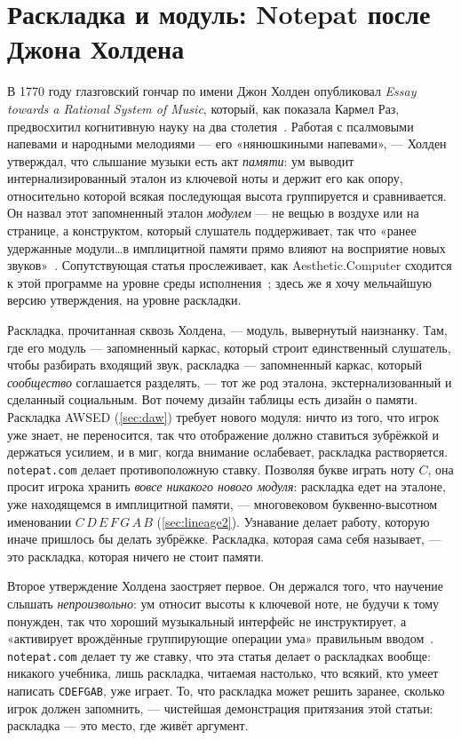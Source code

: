 \documentclass[10pt,letterpaper,twocolumn]{article}
\newcommand{\acdot}{{\color{acpink}.}}
\newcommand{\ac}{Aesthetic{\acdot}Computer}
\DeclareRobustCommand{\key}[1]{\tikz[baseline=(k.base)]{%
 \node[fill=keystroke, rounded corners=1.3pt, inner xsep=2.4pt,
    inner ysep=1.9pt, anchor=base, yshift=-1.2pt] at (0,0)
  {\footnotesize\ttfamily\bfseries\vphantom{A}\phantom{#1}};
 \node[draw=keystroke, line width=0.4pt, fill=keyfill,
    rounded corners=1.3pt, inner xsep=2.4pt, inner ysep=1.9pt,
    anchor=base] (k) at (0,0)
  {\footnotesize\ttfamily\bfseries\vphantom{A}#1};}}
\begin{document}
\appendix
\renewcommand{\thesection}{Приложение~\Alph{section}}

\section{Раскладка и модуль: Notepat после Джона Холдена}
\label{app:holden}

В 1770 году глазговский гончар по имени Джон Холден опубликовал \emph{Essay towards a Rational System of Music}, который, как показала Кармел Раз, предвосхитил когнитивную науку на два столетия~\citep{holden1770,raz2025}. Работая с псалмовыми напевами и народными мелодиями --- его «нянюшкиными напевами», --- Холден утверждал, что слышание музыки есть акт \emph{памяти}: ум выводит интернализированный эталон из ключевой ноты и держит его как опору, относительно которой всякая последующая высота группируется и сравнивается. Он назвал этот запомненный эталон \emph{модулем} --- не вещью в воздухе или на странице, а конструктом, который слушатель поддерживает, так что «ранее удержанные модули\ldots в имплицитной памяти прямо влияют на восприятие новых звуков»~\citep{raz2025}. Сопутствующая статья прослеживает, как \ac{} сходится к этой программе на уровне среды исполнения~\citep{scudder2026holden}; здесь же я хочу мельчайшую версию утверждения, на уровне раскладки.

Раскладка, прочитанная сквозь Холдена, --- модуль, вывернутый наизнанку. Там, где его модуль --- запомненный каркас, который строит единственный слушатель, чтобы разбирать входящий звук, раскладка --- запомненный каркас, который \emph{сообщество} соглашается разделять, --- тот же род эталона, экстернализованный и сделанный социальным. Вот почему дизайн таблицы есть дизайн о памяти. Раскладка AWSED (\textsection\ref{sec:daw}) требует нового модуля: ничто из того, что игрок уже знает, не переносится, так что отображение должно ставиться зубрёжкой и держаться усилием, и в миг, когда внимание ослабевает, раскладка растворяется. \texttt{notepat.com} делает противоположную ставку. Позволяя букве \key{C} играть ноту $C$, она просит игрока хранить \emph{вовсе никакого нового модуля}: раскладка едет на эталоне, уже находящемся в имплицитной памяти, --- многовековом буквенно-высотном именовании $C\,D\,E\,F\,G\,A\,B$ (\textsection\ref{sec:lineage2}). Узнавание делает работу, которую иначе пришлось бы делать зубрёжке. Раскладка, которая сама себя называет, --- это раскладка, которая ничего не стоит памяти.

Второе утверждение Холдена заостряет первое. Он держался того, что научение слышать \emph{непроизвольно}: ум относит высоты к ключевой ноте, не будучи к тому понужден, так что хороший музыкальный интерфейс не инструктирует, а «активирует врождённые группирующие операции ума» правильным вводом~\citep{raz2025}. \texttt{notepat.com} делает ту же ставку, что эта статья делает о раскладках вообще: никакого учебника, лишь раскладка, читаемая настолько, что всякий, кто умеет написать \texttt{CDEFGAB}, уже играет. То, что раскладка может решить заранее, сколько игрок должен запомнить, --- чистейшая демонстрация притязания этой статьи: раскладка --- это место, где живёт аргумент.
\end{document}
